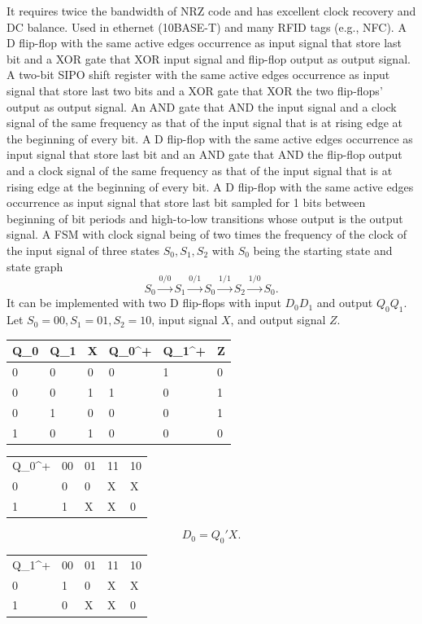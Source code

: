 \documentclass[a4paper,12pt]{report}
\begin{document}
It requires twice the bandwidth of NRZ code and has excellent clock recovery and DC balance. Used in ethernet (10BASE-T) and many RFID tags (e.g., NFC).
A D flip-flop with the same active edges occurrence as input signal that store last bit and a XOR gate that XOR input signal and flip-flop output as output signal.
A two-bit SIPO shift register with the same active edges occurrence as input signal that store last two bits and a XOR gate that XOR the two flip-flops' output as output signal.
An AND gate that AND the input signal and a clock signal of the same frequency as that of the input signal that is at rising edge at the beginning of every bit.
A D flip-flop with the same active edges occurrence as input signal that store last bit and an AND gate that AND the flip-flop output and a clock signal of the same frequency as that of the input signal that is at rising edge at the beginning of every bit.
A D flip-flop with the same active edges occurrence as input signal that store last bit sampled for 1 bits between beginning of bit periods and high-to-low transitions whose output is the output signal.
A FSM with clock signal being of two times the frequency of the clock of the input signal of three states $S_0,S_1,S_2$ with $S_0$ being the starting state and state graph
\[S_0\xrightarrow{0/0}S_1\xrightarrow{0/1}S_0\xrightarrow{1/1}S_2\xrightarrow{1/0}S_0.\]
It can be implemented with two D flip-flops with input $D_0D_1$ and output $Q_0Q_1$. Let $S_0=00,S_1=01,S_2=10$, input signal $X$, and output signal $Z$.
\begin{longtable}[c]{|mmm|mmm|}
\hline
Q_0 & Q_1 & X & Q_0^+ & Q_1^+ & Z \\\hline
0 & 0 & 0 & 0 & 1 & 0 \\
0 & 0 & 1 & 1 & 0 & 1 \\
0 & 1 & 0 & 0 & 0 & 1 \\
1 & 0 & 1 & 0 & 0 & 0 \\\hline
\end{longtable}
\begin{longtable}[c]{mmmmm}
Q_0^+ & 00 & 01 & 11 & 10 \\
0 & 0 & 0 & X & X \\
1 & 1 & X & X & 0 \\
\end{longtable}
\[D_0=Q_0'X.\]
\begin{longtable}[c]{mmmmm}
Q_1^+ & 00 & 01 & 11 & 10 \\
0 & 1 & 0 & X & X \\
1 & 0 & X & X & 0 \\
\end{longtable}
\end{document}
